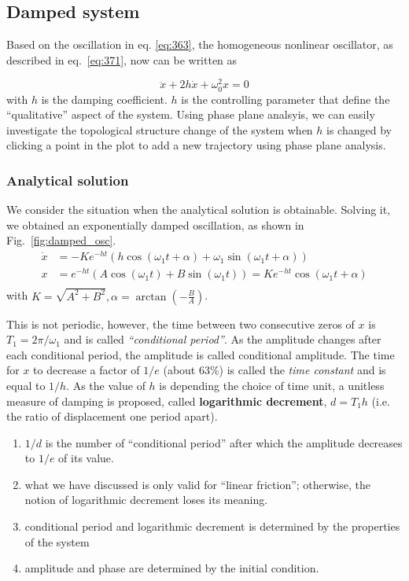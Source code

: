 \subsection{Damped system}
\label{sec:damped-system}


Based on the oscillation in eq. \eqref{eq:363}, the homogeneous
nonlinear oscillator, as described in eq.~\eqref{eq:371}, now can be
written as

\begin{equation}
  \label{eq:376}
  \ddot{x}+2h\dot{x}+\omega_0^2x=0
\end{equation}
with $h$ is the damping coefficient. $h$ is the controlling parameter
that define the ``qualitative'' aspect of the system. Using phase plane
analsyis, we can easily investigate the topological
structure change of the system when $h$ is changed by clicking a point in the
plot to add a new trajectory using phase plane analysis. 

\subsubsection{Analytical solution}
\label{sec:analytical-solution-damped-system}

We consider the situation when the analytical solution is
obtainable. Solving it, we obtained an exponentially damped
oscillation, as shown in Fig.~\ref{fig:damped_osc}.
\begin{equation}
  \label{eq:377}
  \begin{split}
    \dot{x} &= -K e^{-ht}(h\cos(\omega_1t + \alpha)+\omega_1\sin(\omega_1t+\alpha)) \\
    x &= e^{-ht}(A\cos(\omega_1t)+B\sin(\omega_1t))=Ke^{-ht}\cos(\omega_1t+\alpha) \\
  \end{split}
\end{equation}
with $K=\sqrt{A^2+B^2}, \alpha=\arctan(-\frac{B}{A})$.

This is not periodic, however, the time
between two consecutive zeros of $x$ is $T_1=2\pi/\omega_1$ and is
called {\it ``conditional period''}. As the amplitude changes after
each conditional period, the amplitude is called conditional
amplitude. The time for $x$ to decrease a factor of $1/e$ (about 63\%)
is called the {\it time constant} and is equal to $1/h$. As the value
of $h$ is depending the choice of time unit, a unitless measure of
damping is proposed, called {\bf logarithmic decrement}, $d=T_1h$
(i.e. the ratio of displacement one period apart).
\begin{enumerate}
\item $1/d$ is the number of ``conditional period'' after which the
  amplitude decreases to $1/e$ of its value.
\item what we have discussed is only valid for ``linear friction'';
  otherwise, the notion of logarithmic decrement loses its meaning.
\item conditional period and logarithmic decrement is determined by
  the properties of the system
\item amplitude and phase are determined by the initial condition.
\end{enumerate}

